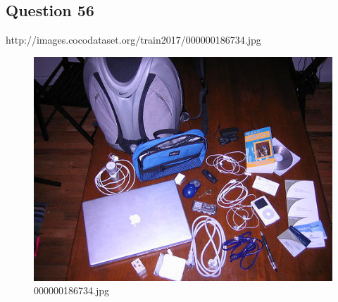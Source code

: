 \subsection*{Question 56}
http://images.cocodataset.org/train2017/000000186734.jpg
\begin{figure}[h]
    \centering
    \includegraphics[width=0.8\linewidth]{../image set/hard/000000186734.jpg}
    \caption{000000186734.jpg}
\end{figure}
